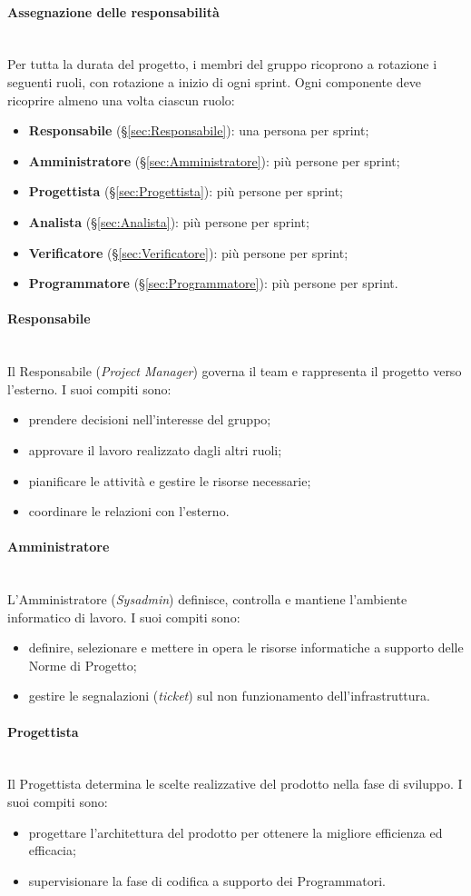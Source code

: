 \documentclass[10pt, letterpaper]{article}
\newcommand{\trisubsection}[1]{\paragraph{#1}\mbox{}\\}
\begin{document}
\trisubsection{Assegnazione delle responsabilità}
\label{sec:Ruoli}
Per tutta la durata del progetto, i membri del gruppo ricoprono a rotazione i seguenti ruoli, con rotazione a inizio di ogni sprint. Ogni componente deve ricoprire almeno una volta ciascun ruolo:

\begin{itemize}
    \item \textbf{Responsabile} (§\ref{sec:Responsabile}): una persona per sprint;
    \item \textbf{Amministratore} (§\ref{sec:Amministratore}): più persone per sprint;
    \item \textbf{Progettista} (§\ref{sec:Progettista}): più persone per sprint;
    \item \textbf{Analista} (§\ref{sec:Analista}): più persone per sprint;
    \item \textbf{Verificatore} (§\ref{sec:Verificatore}): più persone per sprint;
    \item \textbf{Programmatore} (§\ref{sec:Programmatore}): più persone per sprint.
\end{itemize}

\label{sec:Responsabile}
\trisubsection{Responsabile}
Il Responsabile (\textit{Project Manager}) governa il team e rappresenta il progetto verso l'esterno. I suoi compiti sono:
\begin{itemize}
    \item prendere decisioni nell'interesse del gruppo;
    \item approvare il lavoro realizzato dagli altri ruoli;
    \item pianificare le attività e gestire le risorse necessarie;
    \item coordinare le relazioni con l'esterno.
\end{itemize}

\label{sec:Amministratore}
\trisubsection{Amministratore}
L'Amministratore (\textit{Sysadmin}) definisce, controlla e mantiene l'ambiente informatico di lavoro. I suoi compiti sono:
\begin{itemize}
    \item definire, selezionare e mettere in opera le risorse informatiche a supporto delle Norme di Progetto;
    \item gestire le segnalazioni (\textit{ticket}) sul non funzionamento dell'infrastruttura.
\end{itemize}

\label{sec:Progettista}
\trisubsection{Progettista}
Il Progettista determina le scelte realizzative del prodotto nella fase di sviluppo. I suoi compiti sono:
\begin{itemize}
    \item progettare l'architettura del prodotto per ottenere la migliore efficienza ed efficacia;
    \item supervisionare la fase di codifica a supporto dei Programmatori.
\end{itemize}
\end{document}
